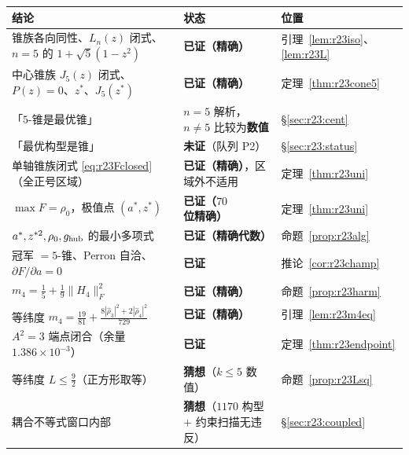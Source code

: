 \documentclass[UTF8,11pt]{ctexart}
\theoremstyle{definition}
\begin{document}
\begin{center}\small
\begin{tabular}{lll}
\toprule
结论 & 状态 & 位置\\
\midrule
锥族各向同性、$L_n(z)$ 闭式、$n=5$ 的 $1+\sqrt5(1-z^2)$ & \textbf{已证（精确）} & 引理~\ref{lem:r23iso}、\ref{lem:r23L}\\
中心锥族 $J_5(z)$ 闭式、$P(z)=0$、$z^*$、$J_5(z^*)$ & \textbf{已证（精确）} & 定理~\ref{thm:r23cone5}\\
「$5$-锥是最优锥」 & $n=5$ 解析，$n\ne5$ 比较为\textbf{数值} & \S\ref{sec:r23:cent}\\
「最优构型是锥」 & \textbf{未证}（队列 P2） & \S\ref{sec:r23:status}\\
单轴锥族闭式 \eqref{eq:r23Fclosed}（全正号区域） & \textbf{已证（精确）}，区域外不适用 & 定理~\ref{thm:r23uni}\\
$\max F=\rho_0$，极值点 $(a^*,z^*)$ & \textbf{已证（$70$ 位精确）} & 定理~\ref{thm:r23uni}\\
$a^*,z^{*2},\rho_0,g_{\rm hub}$ 的最小多项式 & \textbf{已证（精确代数）} & 命题~\ref{prop:r23alg}\\
冠军 $=5$-锥、Perron 自洽、$\partial F/\partial a=0$ & \textbf{已证} & 推论~\ref{cor:r23champ}\\
$m_4=\frac15+\frac19\|H_4\|_F^2$ & \textbf{已证（精确）} & 命题~\ref{prop:r23harm}\\
等纬度 $m_4=\frac{19}{81}+\frac{8|\hat\rho_3|^2+2|\hat\rho_4|^2}{729}$ & \textbf{已证（精确）} & 引理~\ref{lem:r23m4eq}\\
$A^2=3$ 端点闭合（余量 $1.386\times10^{-3}$） & \textbf{已证} & 定理~\ref{thm:r23endpoint}\\
等纬度 $L\le\frac92$（正方形取等） & \textbf{猜想}（$k\le5$ 数值） & 命题~\ref{prop:r23Lsq}\\
耦合不等式窗口内部 & \textbf{猜想}（$1170$ 构型 $+$ 约束扫描无违反） & \S\ref{sec:r23:coupled}\\
\bottomrule
\end{tabular}
\end{center}
\end{document}
